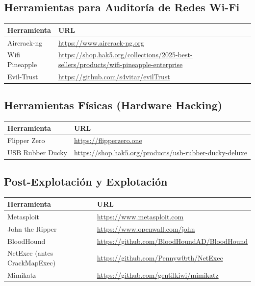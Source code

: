 \documentclass[a4paper, 11pt]{article}
\begin{document}
\subsection*{Herramientas para Auditoría de Redes Wi-Fi}
\begin{table}[H]
\centering
\begin{tabular}{|m{5cm}|m{10cm}|}
\hline
\textbf{Herramienta} & \textbf{URL} \\
\hline
Aircrack-ng & \url{https://www.aircrack-ng.org} \\
\hline
Wifi Pineapple & \url{https://shop.hak5.org/collections/2025-best-sellers/products/wifi-pineapple-enterprise} \\
\hline
Evil-Trust & \url{https://github.com/s4vitar/evilTrust} \\
\hline

\end{tabular}
\end{table}

\subsection*{Herramientas Físicas (Hardware Hacking)}
\begin{table}[H]
\centering
\begin{tabular}{|m{5cm}|m{10cm}|}
\hline
\textbf{Herramienta} & \textbf{URL} \\
\hline
Flipper Zero & \url{https://flipperzero.one} \\
\hline
USB Rubber Ducky & \url{https://shop.hak5.org/products/usb-rubber-ducky-deluxe} \\
\hline
\end{tabular}
\end{table}

\subsection*{Post-Explotación y Explotación}
\begin{table}[H]
\centering
\begin{tabular}{|m{5cm}|m{10cm}|}
\hline
\textbf{Herramienta} & \textbf{URL} \\
\hline
Metasploit & \url{https://www.metasploit.com} \\
\hline
John the Ripper & \url{https://www.openwall.com/john} \\
\hline
BloodHound & \url{https://github.com/BloodHoundAD/BloodHound} \\
\hline
NetExec (antes CrackMapExec) & \url{https://github.com/Pennyw0rth/NetExec} \\
\hline
Mimikatz & \url{https://github.com/gentilkiwi/mimikatz} \\
\hline
\end{tabular}
\end{table}
\end{document}
